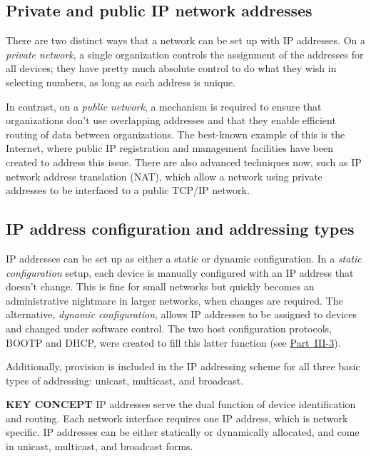 \subsection{Private and public IP network addresses}

There are two distinct ways that a network can be set up with IP addresses.
On a {\emph{private network}}, a single organization controls the assignment of the addresses for all devices; they have pretty much absolute control to do what they wish in selecting numbers, as long as each address is unique.

In contrast, on a {\emph{public network}}, a mechanism is required to ensure that organizations don't use overlapping addresses and that they enable efficient routing of data between organizations.
The best-known example of this is the Internet, where public IP registration and management facilities have been created to address this issue.
There are also advanced techniques now, such as IP network address translation (NAT), which allow a network using private addresses to be interfaced to a public TCP/IP network.



\subsection{IP address configuration and addressing types}

IP addresses can be set up as either a static or dynamic configuration.
In a {\emph{static configuration}} setup, each device is manually configured with an IP address that doesn't change.
This is fine for small networks but quickly becomes an administrative nightmare in larger networks, when changes are required.
The alternative, {\emph{dynamic configuration}}, allows \protect\hypertarget{ch16.htmlux5cux23idx-CHP-16-0652}{}{}IP addresses to be assigned to devices and changed under software control.
The two host configuration protocols, BOOTP and DHCP, were created to fill this latter function (see \protect\hyperlink{pt14.html}{Part~III-3}).

Additionally, provision is included in the IP addressing scheme for all three basic types of addressing: unicast, multicast, and broadcast.

{\textbf{KEY CONCEPT}} IP addresses serve the dual function of device identification and routing. Each network interface requires one IP address, which is network specific. IP addresses can be either statically or dynamically allocated, and come in unicast, multicast, and broadcast forms.



